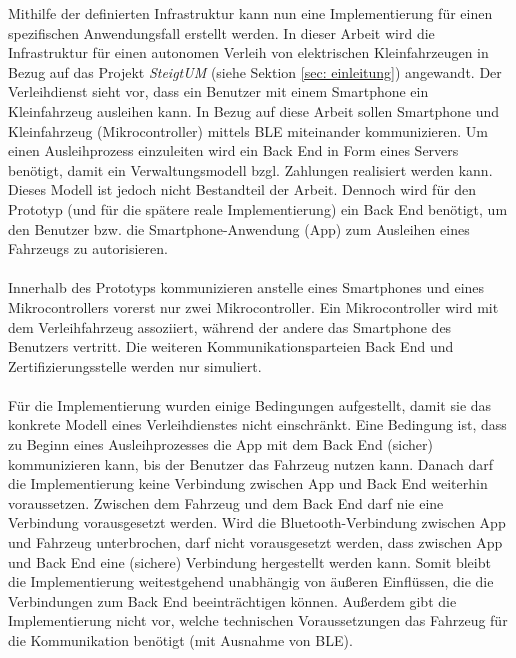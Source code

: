 Mithilfe der definierten Infrastruktur kann nun eine Implementierung für einen spezifischen Anwendungsfall erstellt werden. In dieser Arbeit wird die Infrastruktur für einen autonomen Verleih von elektrischen Kleinfahrzeugen in Bezug auf das Projekt \textit{SteigtUM} (siehe Sektion \ref{sec: einleitung}) angewandt. Der Verleihdienst sieht vor, dass ein Benutzer mit einem Smartphone ein Kleinfahrzeug ausleihen kann. In Bezug auf diese Arbeit sollen Smartphone und Kleinfahrzeug (Mikrocontroller) mittels BLE miteinander kommunizieren. Um einen Ausleihprozess einzuleiten wird ein Back End in Form eines Servers benötigt, damit ein Verwaltungsmodell bzgl. Zahlungen realisiert werden kann. Dieses Modell ist jedoch nicht Bestandteil der Arbeit. Dennoch wird für den Prototyp (und für die spätere reale Implementierung) ein Back End benötigt, um den Benutzer bzw. die Smartphone-Anwendung (App) zum Ausleihen eines Fahrzeugs zu autorisieren.
\\\\
Innerhalb des Prototyps kommunizieren anstelle eines Smartphones und eines Mikrocontrollers vorerst nur zwei Mikrocontroller. Ein Mikrocontroller wird mit dem Verleihfahrzeug assoziiert, während der andere das Smartphone des Benutzers vertritt. Die weiteren Kommunikationsparteien Back End und Zertifizierungsstelle werden nur simuliert.
\\\\
Für die Implementierung wurden einige Bedingungen aufgestellt, damit sie das konkrete Modell eines Verleihdienstes nicht einschränkt. Eine Bedingung ist, dass zu Beginn eines Ausleihprozesses die App mit dem Back End (sicher) kommunizieren kann, bis der Benutzer das Fahrzeug nutzen kann. Danach darf die Implementierung keine Verbindung zwischen App und Back End weiterhin voraussetzen. Zwischen dem Fahrzeug und dem Back End darf nie eine Verbindung vorausgesetzt werden. Wird die Bluetooth-Verbindung zwischen App und Fahrzeug unterbrochen, darf nicht vorausgesetzt werden, dass zwischen App und Back End eine (sichere) Verbindung hergestellt werden kann. Somit bleibt die Implementierung weitestgehend unabhängig von äußeren Einflüssen, die die Verbindungen zum Back End beeinträchtigen können. Außerdem gibt die Implementierung nicht vor, welche technischen Voraussetzungen das Fahrzeug für die Kommunikation benötigt (mit Ausnahme von BLE).